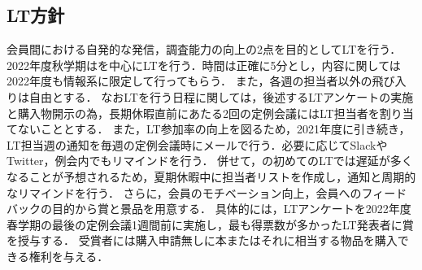 \subsection*{LT方針}


会員間における自発的な発信，調査能力の向上の2点を目的としてLTを行う．
2022年度秋学期は\firstGrade{}を中心にLTを行う．時間は正確に5分とし，内容に関しては2022年度も情報系に限定して行ってもらう．
また，各週の担当者以外の飛び入りは自由とする．
なおLTを行う日程に関しては，後述するLTアンケートの実施と購入物開示の為，長期休暇直前にあたる2回の定例会議にはLT担当者を割り当てないこととする．
また，LT参加率の向上を図るため，2021年度に引き続き，LT担当週の通知を毎週の定例会議時にメールで行う．必要に応じてSlackやTwitter，例会内でもリマインドを行う．
併せて，\firstGrade{}の初めてのLTでは遅延が多くなることが予想されるため，夏期休暇中に担当者リストを作成し，通知と周期的なリマインドを行う．
さらに，会員のモチベーション向上，会員へのフィードバックの目的から賞と景品を用意する．
具体的には，LTアンケートを2022年度春学期の最後の定例会議1週間前に実施し，最も得票数が多かったLT発表者に賞を授与する．
受賞者には購入申請無しに本またはそれに相当する物品を購入できる権利を与える．